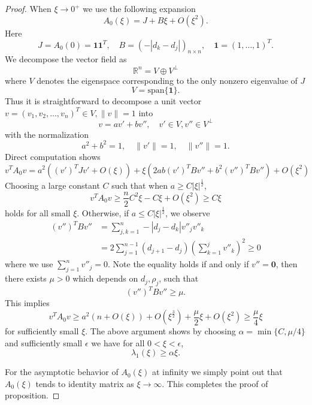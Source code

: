 \documentclass[11pt]{article}
\theoremstyle{definition}
\numberwithin{equation}{section}
\begin{document}
\begin{proof}
    When $\xi\rightarrow0^+$ we use the following expansion
    \begin{equation}
        A_0(\xi)=J+B\xi+O(\xi^2).
    \end{equation}
    Here
    \begin{equation}
        J=A_0(0)=\textbf{1}\textbf{1}^T,\quad B=(-|d_k-d_j|)_{n\times n},\quad \textbf{1}=(1,\dots,1)^T.
    \end{equation}
    We decompose the vector field as
    \begin{equation}
        \mathbb{R}^n=V\oplus V^{\perp}
    \end{equation}
    where $V$ denotes the eigenspace corresponding to the only nonzero eigenvalue of $J$
    \begin{equation}
        V=\text{span}\{\textbf{1}\}.
    \end{equation}
    Thus it is straightforward to decompose a unit vector $v=(v_1,v_2,\dots,v_n)^T\in V,\|v\|=1$ into
    \begin{equation}
        v=av'+bv'',\quad v'\in V,v''\in V^{\perp}
    \end{equation}
    with the normalization
    \begin{equation}
        a^2+b^2=1,\quad \|v'\|=1,\quad \|v''\|=1.
    \end{equation}
Direct computation shows
\begin{equation}
    v^TA_0v=a^2\left((v')^TJv'+O(\xi)\right)+\xi\left(2ab(v')^TBv''+b^2(v'')^TBv''\right)+O(\xi^2)
\end{equation}
Choosing a large  constant $C$ such that when $a\geq C|\xi|^{\frac{1}{2}}$,
\begin{equation}
    v^TA_0v\geq \frac{n}{2}C^2\xi-C\xi+O(\xi^2)\geq C\xi
\end{equation}
holds for all small $\xi$. Otherwise, if  $a\leq C|\xi|^{\frac{1}{2}}$, we observe   \begin{align}
        (v'')^TBv''&=\sum_{j,k=1}^n-|d_j-d_k|v''_jv''_k\\
        &=2\sum_{j=1}^{n-1}(d_{j+1}-d_j)\left(\sum_{k=1}^jv''_k\right)^2\geq 0
    \end{align}
    where we use $\sum_{j=1}^nv''_j=0$. Note the equality holds if and only if $v''=\textbf{0}$, then there exists $\mu>0$ which depends on $d_j,\rho_j$, such that
    \begin{equation}
        (v'')^TBv''\geq\mu. 
    \end{equation}
    This implies
    \begin{equation}
        v^TA_0v\geq a^2(n+O(\xi))+O(\xi^{\frac{3}{2}})+\frac{\mu}{2}\xi+O(\xi^2)\geq \frac{\mu}{4}\xi
    \end{equation}
    for sufficiently small $\xi$. The above argument shows by choosing $\alpha=\min\{C,\mu/4\}$ and sufficiently small  $\epsilon$ we have for all $0<\xi<\epsilon$,
    \begin{equation}
        \lambda_1(\xi)\geq\alpha\xi.
    \end{equation}

    For the asymptotic behavior of $A_0(\xi)$ at infinity we simply point out that $A_0(\xi)$ tends to identity matrix as $\xi\rightarrow\infty$. This completes the proof of proposition.
\end{proof}
\end{document}
